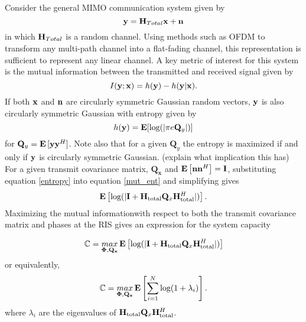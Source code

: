 Consider the general MIMO communication system given by 
	\begin{equation}\label{com_system}
	\mathbf{y} = \mathbf{H}_{Total}\mathbf{x} + \mathbf{n}
	\end{equation}
	in which $\mathbf{H}_{Total}$ is a random channel. Using methods such as OFDM to transform any multi-path channel into a flat-fading channel, this representation is sufficient to represent any linear channel.
A key metric of interest for this system is the mutual information between the transmitted and received signal given by 
\begin{equation}\label{mut_ent}
I(\mathbf{y};\mathbf{x}) = h(\mathbf{y}) - h(\mathbf{y}|\mathbf{x}).
\end{equation}
If both $\mathbf{x}$ and $\mathbf{n}$ are circularly symmetric Gaussian random vectors, $\mathbf{y}$ is also circularly symmetric Gaussian with entropy given by \cite{telatar1999capacity} 
\begin{equation}\label{entropy}
h(\mathbf{y}) = \mathop{\bf E{}}[\text{log{}}(|\pi e \mathbf{Q}_{y}|)]
\end{equation}
 for $\mathbf{Q}_{y} = \mathop{\bf E{}}{[\mathbf{y} \mathbf{y}^H]}$. Note also that for a given $\mathbf{Q}_{y}$ the entropy is maximized if and only if $\mathbf{y}$ is circularly symmetric Gaussian. (explain what implication this has)
For a given transmit covariance matrix, $\mathbf{Q_x}$ and $\mathop{\bf E{}}\left[\mathbf{n}\mathbf{n}^H \right] = \mathbf{I}$, substituting equation \eqref{entropy} into equation
\eqref{mut_ent} and simplifying gives
\begin{equation}\label{mut_inf}
\mathop{\bf E{}} \left[\text{log{}}(|\mathbf{I} + \mathbf{H}_\text{total} \mathbf{Q}_x \mathbf{H}_\text{total}^H|)\right].
\end{equation}
Maximizing the mutual informationwith respect to both the
transmit covariance matrix and phases at the RIS gives an expression for the system capacity

\begin{equation}\label{capacity}
\mathbb{C} = \underset{\boldsymbol{\Phi},\mathbf{Q_x}}{\mathop{max}} \mathop{\bf E{}} \left[\text{log{}}(|\mathbf{I} + \mathbf{H}_\text{total} \mathbf{Q}_x \mathbf{H}_\text{total}^H|)\right]
\end{equation}
or equivalently,
\begin{equation}\label{capacity_tricky}
\mathbb{C} = \underset{\boldsymbol{\Phi},\mathbf{Q_x}}{\mathop{max}} \mathop{\bf E{}} \left[\sum_{i=1}^{N}\text{log{}}(1 + \lambda_i)\right].
\end{equation}
where $\lambda_i$ are the eigenvalues of $\mathbf{H}_\text{total} \mathbf{Q}_x \mathbf{H}_\text{total}^H$.


